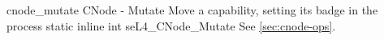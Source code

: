 %
%
%
%

\apidoc
{cnode_mutate}
{CNode - Mutate}
{Move a capability, setting its badge in the process}
{static inline int seL4\_CNode\_Mutate}
{
}
{\errorenumdesc}
{See \autoref{sec:cnode-ops}.}

